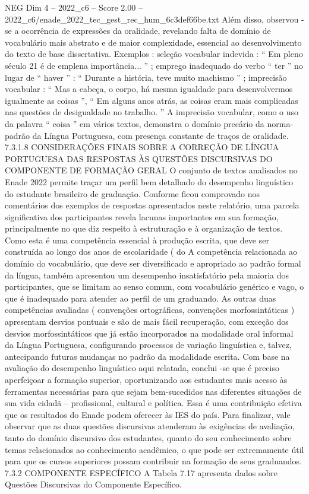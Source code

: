 \begin{textsample}{NEG Dim 4 – 2022\_c6 – Score 2.00 – 2022\_c6/enade\_2022\_tec\_gest\_rec\_hum\_6c3def66be.txt}
Além disso, observou -se a ocorrência de expressões da oralidade, revelando falta de domínio de vocabulário mais abstrato e de maior complexidade, essencial ao desenvolvimento do texto de base dissertativa.
Exemplos : seleção vocabular indevida : “ Em pleno século 21 é de emplena importância... ” ; emprego inadequado do verbo “ ter ” no lugar de “ haver ” : “ Durante a história, teve muito machismo ” ; imprecisão vocabular : “ Mas a cabeça, o corpo, há mesma igualdade para desenvolvermos igualmente as coisas ”, “ Em alguns anos atrás, as coisas eram mais complicadas nas questões de desigualdade no trabalho. ” A imprecisão vocabular, como o uso da palavra “ coisa ” em vários textos, demonstra o domínio precário da norma-padrão da Língua Portuguesa, com presença constante de traços de oralidade. 7.3.1.8 CONSIDERAÇÕES FINAIS SOBRE A CORREÇÃO DE LÍNGUA PORTUGUESA DAS RESPOSTAS ÀS QUESTÕES DISCURSIVAS DO COMPONENTE DE FORMAÇÃO GERAL O conjunto de textos analisados no Enade 2022 permite traçar um perfil bem detalhado do desempenho linguístico do estudante brasileiro de graduação.
Conforme ficou comprovado nos comentários dos exemplos de respostas apresentados neste relatório, uma parcela significativa dos participantes revela lacunas importantes em sua formação, principalmente no que diz respeito à estruturação e à organização de textos.
Como esta é uma competência essencial à produção escrita, que deve ser construída ao longo dos anos de escolaridade ( do A competência relacionada ao domínio do vocabulário, que deve ser diversificado e apropriado ao padrão formal da língua, também apresentou um desempenho insatisfatório pela maioria dos participantes, que se limitam ao senso comum, com vocabulário genérico e vago, o que é inadequado para atender ao perfil de um graduando.
As outras duas competências avaliadas ( convenções ortográficas, convenções morfossintáticas ) apresentam desvios pontuais e são de mais fácil recuperação, com exceção dos desvios morfossintáticos que já estão incorporados na modalidade oral informal da Língua Portuguesa, configurando processos de variação linguística e, talvez, antecipando futuras mudanças no padrão da modalidade escrita.
Com base na avaliação do desempenho linguístico aqui relatada, conclui -se que é preciso aperfeiçoar a formação superior, oportunizando aos estudantes mais acesso às ferramentas necessárias para que sejam bem-sucedidos nas diferentes situações de sua vida cidadã – profissional, cultural e política.
Essa é uma contribuição efetiva que os resultados do Enade podem oferecer às IES do país.
Para finalizar, vale observar que as duas questões discursivas atenderam às exigências de avaliação, tanto do domínio discursivo dos estudantes, quanto do seu conhecimento sobre temas relacionados ao conhecimento acadêmico, o que pode ser extremamente útil para que os cursos superiores possam contribuir na formação de seus graduandos. 7.3.2 COMPONENTE ESPECÍFICO A Tabela 7.17 apresenta dados sobre Questões Discursivas do Componente Específico.

\end{textsample}
